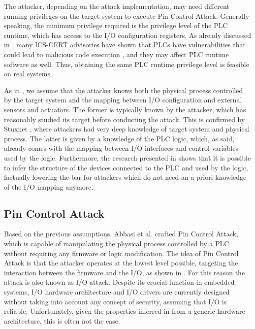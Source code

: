 The attacker, depending on the attack implementation, may need different running privileges on the target system to execute Pin Control Attack.
Generally speaking, the minimum privilege required is the privilege level of the PLC runtime, which has access to the I/O configuration registers.
As already discussed in \cite{ghostplc}, many ICS-CERT advisories have shown that PLCs have vulnerabilities that could lead to malicious code execution
\cite{plc-network,abb-codesys,codesys-server,schneider-bof,rockwell-vuln,rockwell-vuln2}, and they may affect PLC runtime software as well.
Thus, obtaining the same PLC runtime privilege level is feasible on real systems.

As in \cite{ghostplc}, we assume that the attacker knows both the physical process controlled by the target system and the mapping
between I/O configuration and external sensors and actuators. The former is typically known by the attacker, which has reasonably studied its target before conducting the attack.
This is confirmed by Stuxnet \cite{stuxnet}, where attackers had very deep knowledge of target system and physical process.
The latter is given by a knowledge of the PLC logic, which, as said, already comes with the mapping between I/O interfaces and control variables used by the logic.
Furthermore, the research presented in \cite{dynamic-payload,sabot} shows that it is possible to infer the structure of the devices connected to the PLC and used by the logic,
factually lowering the bar for attackers which do not need an a priori knowledge of the I/O mapping anymore.


\subsection{Pin Control Attack}

Based on the previous assumptions, Abbasi et al. \cite{ghostplc} crafted Pin Control Attack, which is capable of manipulating the physical process
controlled by a PLC without requiring any firmware or logic modification.
The idea of Pin Control Attack is that the attacker operates at the lowest level possible, targeting the interaction
between the firmware and the I/O, as shown in . For this reason the attack is also known as I/O attack.
Despite its crucial function in embedded systems, I/O hardware architecture and I/O drivers are currently designed
without taking into account any concept of security, assuming that I/O is reliable. Unfortunately, given the properties inferred in 
from a generic hardware architecture, this is often not the case.

